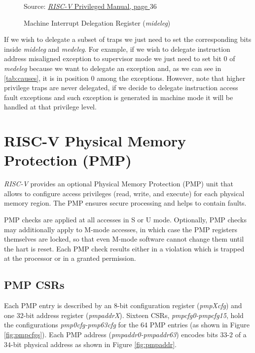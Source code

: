 \begin{figure}[H]
  \centering
  \def\stackalignment{r} %
  {\scriptsize Source: \href{https://drive.google.com/file/d/17GeetSnT5wW3xNuAHI95-SI1gPGd5sJ_/view}{\textit{RISC-V} Privileged Manual, page $36$}}
  \caption{Machine Interrupt Delegation Register (\textit{mideleg})}
  \label{fig:mideleg}
\end{figure}

If we wish to delegate a subset of traps we just need to set the corresponding
bits inside \textit{mideleg} and \textit{medeleg}. For example, if we wish to
delegate instruction address misaligned exception to supervisor mode we just
need to set bit $0$ of \textit{medeleg} because we want to delegate an exception
and, as we can see in \ref{tab:causes}, it is in position $0$ among the exceptions.
However, note that higher privilege traps are never delegated, if we decide to
delegate instruction access fault exceptions and such exception is generated in
machine mode it will be handled at that privilege level.

\section{RISC-V Physical Memory Protection (PMP)}
\label{sec:riscv_pmp}

\textit{RISC-V} provides an optional Physical Memory Protection (PMP) unit that
allows to configure access privileges (read, write, and execute) for each
physical memory region. The PMP ensures secure processing and helps to contain faults.

PMP checks are applied at all accesses in S or U mode. Optionally, PMP checks may
additionally apply to M-mode accesses, in which case the PMP registers
themselves are locked, so that even M-mode software cannot change them until the
hart is reset. Each PMP check results either in a violation which is trapped at
the processor or in a granted permission.

\subsection{PMP CSRs}
\label{subsec:riscv_pmpcsr}

Each PMP entry is described by an 8-bit configuration register (\textit{pmpXcfg})
and one $32$-bit address register (\textit{pmpaddrX}). Sixteen CSRs, \textit{pmpcfg0-pmpcfg15},
hold the configurations \textit{pmp0cfg-pmp63cfg} for the 64 PMP entries (as shown
in Figure \ref{fig:pmpcfgs}). Each PMP address (\textit{pmpaddr0-pmpaddr63})
encodes bits $33$-$2$ of a $34$-bit physical address as shown in Figure
\ref{fig:pmpaddr}.

